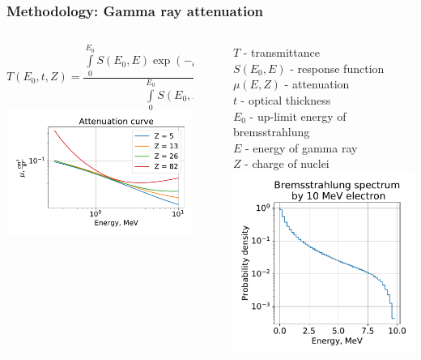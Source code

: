 \documentclass[11pt]{beamer}
\begin{document}
    \begin{frame}
    \frametitle{Methodology: Gamma ray attenuation}
    \begin{columns}
        \begin{column}{0.7\textwidth}
            $$
            T(E_0, t, Z) = \frac{\int \limits_0^{E_0} S(E_0, E) \exp(-\mu(E,Z)\times t)~dE)}{\int \limits_0^{E_0} S(E_0, E)~dE}
            $$
            \includegraphics[width=1\textwidth]{figures/Attenuation.pdf}
        \end{column}
    \vline~
        \begin{column}{0.4\textwidth} 
            $T$ -  transmittance\\
            $S(E_0, E)$ - response function\\
            $\mu(E,Z)$ - attenuation\\
            $t$ -  optical thickness\\
            $E_0$ -  up-limit energy of bremsstrahlung\\
            $E$ - energy of gamma ray\\
            $Z$ - charge of nuclei 
            \includegraphics[width=1\textwidth]{figures/Bremsstrahlung.pdf}

\end{column}
\end{columns}
\end{frame}
\end{document}
